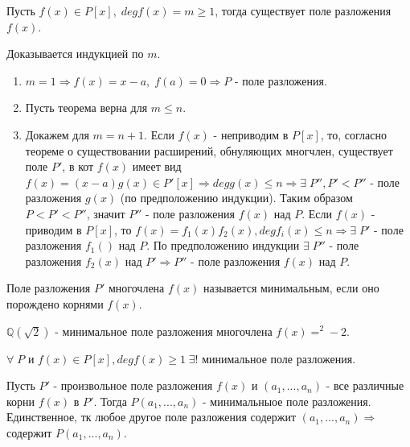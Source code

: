 \begin{proofs}
	Пусть $f(x) \in P[x],\; degf(x) = m \geq 1$, тогда существует поле разложения $f(x)$.
  \begin{dokvo}
    Доказывается индукцией по $m.\;$
    \begin{enumerate}
    \item $m = 1 \Rightarrow f(x) = x-a,\; f(a) = 0 \Rightarrow P$ - поле разложения.
    \item Пусть теорема верна для $m \leq n$.
    \item Докажем для $m = n + 1$. Если $f(x)$ - неприводим в $P[x]$, то, согласно теореме о существовании расширений, обнуляющих многчлен,
    существует поле $P'$, в кот $f(x)$ имеет вид $f(x) = (x-a)g(x) \in P'[x] \Rightarrow degg(x) \leq n \Rightarrow \exists\; P'', P' < P''$
    - поле разложения $g(x)$ (по предположению индукции). Таким образом $P < P' < P''$, значит $P''$ - поле разложения
    $f(x)$ над $P$. Если $f(x)$ - приводим в $P[x]$, то $f(x) = f_1(x)f_2(x), degf_i(x) \leq n \Rightarrow \exists\; P'$ - поле разложения
    $f_1()$ над $P$. По предположению индукции $\exists\; P''$ - поле разложения $f_2(x)$ над $P'\Rightarrow P''$ - поле разложения
    $f(x)$ над $P$.
  \end{enumerate}
	\end{dokvo}
\end{proofs}

\begin{defs}
  Поле разложения $P'$ многочлена $f(x)$ называется минимальным, если оно порождено корнями $f(x)$.
\end{defs}

\begin{example}
  $\mathbb{Q}(\sqrt{2})$ - минимальное поле разложения многочлена $f(x) = ^2 - 2$.
\end{example}

\begin{proofs}
	$\forall\; P$ и $f(x) \in P[x], degf(x) \geq 1\; \exists!$ минимальное поле разложения.
  \begin{dokvo}
    Пусть $P'$ - произвольное поле разложения $f(x)$ и $(a_1, ... , a_n)$ - все различные корни $f(x)$ в $P'$. 
    Тогда $P(a_1, ... , a_n)$ - минимальныое поле разложения. Единственное, тк любое другое поле разложения содержит
    $(a_1, ... , a_n) \Rightarrow $ содержит $P(a_1, ... , a_n)$. 
	\end{dokvo}
\end{proofs}

\newpage
